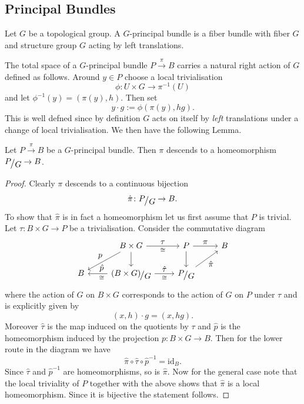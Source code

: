 \subsection{Principal Bundles}

\begin{definition}
    \label{fiber_bundles:def:principal_bundle}
    Let $G$ be a topological group. A $G$-principal bundle is a fiber bundle with fiber $G$ and structure group $G$ acting by left translations.
\end{definition}

The total space of a $G$-principal bundle $P \xrightarrow{\pi} B$ carries a natural right action of $G$ defined as follows. Around $y \in P$ choose a local trivialisation
\[
\phi \colon U \times G \to \pi^{-1}(U)
\]
and let $\phi^{-1}(y) = (\pi(y),h)$. Then set 
\[
y \cdot g := \phi(\pi(y),hg).
\]
This is well defned since by definition $G$ acts on itself by \textit{left} translations under a change of local trivialisation. We then have the following Lemma.

\begin{lemma}
    Let $P \xrightarrow{\pi} B$ be a $G$-principal bundle. Then $\pi$ descends to a homeomorphism $\modulo{P}{G} \to B$.
\end{lemma}

\begin{proof}
    Clearly $\pi$ descends to a continuous bijection 
    \[
    \hat{\pi} \colon \modulo{P}{G} \to B.
    \]
    To show that $\hat{\pi}$ is in fact a homeomorphism let us first assume that $P$ is trivial. Let $\tau\colon B \times G \to P$ be a trivialisation. Consider the commutative diagram
   \[
\begin{tikzcd}[every label/.append style={font=\normalsize}]
	& {B \times G} & P & B \\
	B & {\modulo{(B \times G)}{G}} & {\modulo{P}{G}}
	\arrow["\tau", "{\scriptstyle\cong}"', from=1-2, to=1-3]
	\arrow["p"', from=1-2, to=2-1]
	\arrow[from=1-2, to=2-2]
	\arrow["\pi", from=1-3, to=1-4]
	\arrow[from=1-3, to=2-3]
	\arrow["\hat{p}"', "{\scriptstyle\cong}", from=2-2, to=2-1, pos = 0.3]
	\arrow["{\hat{\tau}}", "{\scriptstyle\cong}"', from=2-2, to=2-3]
	\arrow["{\hat{\pi}}"', from=2-3, to=1-4]
\end{tikzcd}
\]
where the action of $G$ on $B \times G$ corresponds to the action of $G$ on $P$ under $\tau$ and is explicitly given by 
\[
(x,h) \cdot g = (x,hg).
\]
Moreover $\hat{\tau}$ is the map induced on the quotients by $\tau$ and $\hat{p}$ is the homeomorphism induced by the projection $p \colon B \times G \to B$. Then for the lower route in the diagram we have 
\[
\hat{\pi} \circ \hat{\tau} \circ \hat{p}^{-1} = \mathrm{id}_B.
\]
Since $\hat{\tau}$ and $\hat{p}^{-1}$ are homeomorphisms, so is $\hat{\pi}$. Now for the general case note that the local triviality of $P$ together with the above shows that $\hat{\pi}$ is a local homeomorphism. Since it is bijective the statement follows.
\end{proof}

